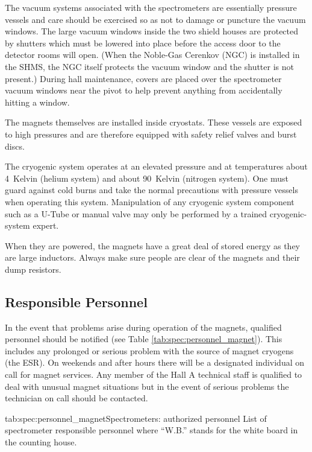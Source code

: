\begin{safetyen}{0}{0}
The vacuum systems associated with the spectrometers are essentially 
pressure vessels and care should be exercised so as not to damage or puncture the 
vacuum windows.   The large vacuum windows inside the two shield houses are protected
by shutters which must be lowered into place before the access door to the
detector rooms will open. (When the Noble-Gas Cerenkov (NGC) is installed in the SHMS, 
the NGC itself protects the vacuum window and the shutter is not present.)
During hall maintenance, covers are placed over the spectrometer
vacuum windows near the pivot
to help prevent anything from accidentally hitting a window.

The magnets themselves are installed inside cryostats.  These vessels 
are exposed to high pressures and are therefore equipped with safety 
relief valves and burst discs.   

The cryogenic system operates at an elevated pressure and at temperatures
about 4~Kelvin (helium system) and about 90~Kelvin (nitrogen system).  One must
guard against cold burns and take the normal precautions with pressure
vessels when operating this system.  Manipulation of any cryogenic system
component such as a U-Tube or manual valve may only be performed by
a trained cryogenic-system expert.

When they are powered, the magnets have a great deal of stored energy as they are large 
inductors. Always make sure people are clear of the magnets and their dump resistors.

\subsection{Responsible Personnel}

In the event that problems arise during 
operation of the magnets, qualified personnel should be notified
(see Table \ref{tab:spec:personnel_magnet}).  
This includes any prolonged or serious problem with the source of magnet 
cryogens (the ESR).  On weekends and after hours there will be a 
designated individual on call for magnet services.  Any member of the 
Hall A technical staff is qualified to deal with unusual magnet 
situations but in the event of serious problems the technician on
call should be contacted.

\begin{namestab}{tab:spec:personnel_magnet}{Spectrometers: authorized personnel}{%
      List of spectrometer responsible personnel where ``W.B.'' stands for the white board 
      in the counting house.}
   \PaulBrindza{}
   \SteveLassiter{}
   \EricSun{}
   \MikeFowler{}
   \JoeBeaufait{}
   \JackSegal{}
   \MahlonLong{}
\end{namestab}


\end{safetyen}

